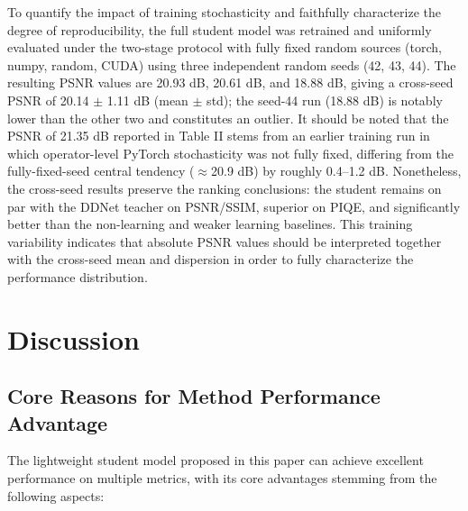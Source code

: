 \documentclass[sensors,article,submit,moreauthors]{Definitions/mdpi}
\begin{document}
To quantify the impact of training stochasticity and faithfully characterize the degree of reproducibility, the full student model was retrained and uniformly evaluated under the two-stage protocol with fully fixed random sources (torch, numpy, random, CUDA) using three independent random seeds (42, 43, 44). The resulting PSNR values are 20.93 dB, 20.61 dB, and 18.88 dB, giving a cross-seed PSNR of 20.14 $\pm$ 1.11 dB (mean $\pm$ std); the seed-44 run (18.88 dB) is notably lower than the other two and constitutes an outlier. It should be noted that the PSNR of 21.35 dB reported in Table II stems from an earlier training run in which operator-level PyTorch stochasticity was not fully fixed, differing from the fully-fixed-seed central tendency ($\approx$20.9 dB) by roughly 0.4--1.2 dB. Nonetheless, the cross-seed results preserve the ranking conclusions: the student remains on par with the DDNet teacher on PSNR/SSIM, superior on PIQE, and significantly better than the non-learning and weaker learning baselines. This training variability indicates that absolute PSNR values should be interpreted together with the cross-seed mean and dispersion in order to fully characterize the performance distribution.

\section{Discussion}

\subsection{Core Reasons for Method Performance Advantage}

The lightweight student model proposed in this paper can achieve excellent performance on multiple metrics, with its core advantages stemming from the following aspects:
\end{document}

